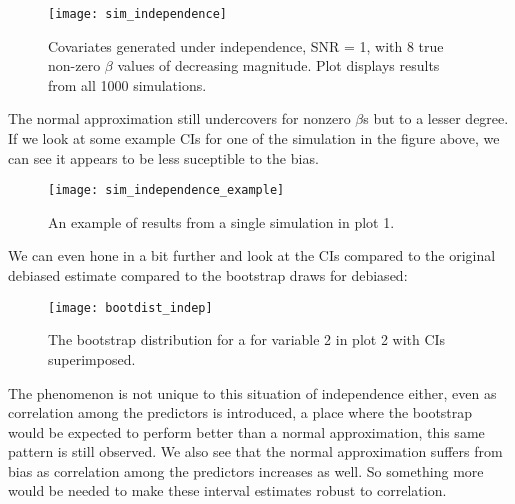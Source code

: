 \begin{figure}[hbtp]
    \begin{center}
    \texttt{[image: sim\_independence]}
    \caption{\label{Fig:sim_independence} Covariates generated under independence, SNR = 1, with 8 true non-zero $\beta$ values of decreasing magnitude. Plot displays results from all 1000 simulations.}
    \end{center}
\end{figure}

The normal approximation still undercovers for nonzero $\beta$s but to a lesser degree. If we look at some example CIs for one of the simulation in the figure above, we can see it appears to be less suceptible to the bias.

\begin{figure}[hbtp]
    \begin{center}
    \texttt{[image: sim\_independence\_example]}
    \caption{\label{Fig:sim_independence_exaple} An example of results from a single simulation in plot 1.}
    \end{center}
\end{figure}

We can even hone in a bit further and look at the CIs compared to the original debiased estimate compared to the bootstrap draws for debiased:

\begin{figure}[hbtp]
    \begin{center}
    \texttt{[image: bootdist\_indep]}
    \caption{\label{Fig:bootdist_indep} The bootstrap distribution for a for variable 2 in plot 2 with CIs superimposed. }
    \end{center}
\end{figure}

The phenomenon is not unique to this situation of independence either, even as correlation among the predictors is introduced, a place where the bootstrap would be expected to perform better than a normal approximation, this same pattern is still observed. We also see that the normal approximation suffers from bias as correlation among the predictors increases as well. So something more would be needed to make these interval estimates robust to correlation. 

